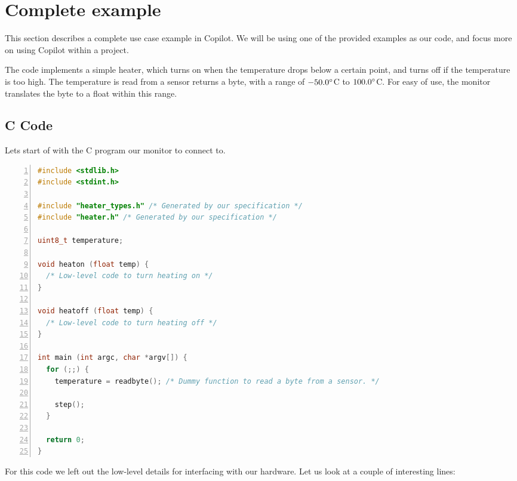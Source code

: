 \section{Complete example}
\label{sec:complete_example}
This section describes a complete use case example in Copilot. We will be using
one of the provided examples as our code, and focus more on using Copilot
within a project.

The code implements a simple heater, which turns on when the temperature drops
below a certain point, and turns off if the temperature is too high. The
temperature is read from a sensor returns a byte, with a range of
$-50.0\degree$C to $100.0\degree$C. For easy of use, the monitor translates the
byte to a float within this range.

\subsection{C Code}
Lets start of with the C program our monitor to connect to.
\begin{lstlisting}[language=c, numbers=left]
#include <stdlib.h>
#include <stdint.h>

#include "heater_types.h" /* Generated by our specification */
#include "heater.h" /* Generated by our specification */

uint8_t temperature;

void heaton (float temp) {
  /* Low-level code to turn heating on */
}

void heatoff (float temp) {
  /* Low-level code to turn heating off */
}

int main (int argc, char *argv[]) {
  for (;;) {
    temperature = readbyte(); /* Dummy function to read a byte from a sensor. */

    step();
  }

  return 0;
}
\end{lstlisting}

For this code we left out the low-level details for interfacing with our
hardware. Let us look at a couple of interesting lines:

